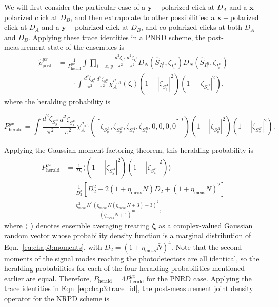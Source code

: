 \documentclass[aps,twocolumn,secnumarabic,amsmath,amssymb,pra,groupedaddress,
showpacs, showkeys]{revtex4-1}
\newcommand{\pna}[1]{\left(#1\right)}
\newcommand{\pnb}[1]{\left[#1\right]}
\newcommand{\eqn}[1]{
\begin{equation}
	#1
\end{equation}
}
\begin{document}
We will first consider the particular case of a $\mathbf{y}-$polarized click at
$D_A$ and a $\mathbf{x}-$polarized click at $D_B$, and then extrapolate to
other possibilities: a $\mathbf{x}-$polarized click at $D_A$ and a
$\mathbf{y}-$polarized click at $D_B$, and co-polarized clicks at both $D_A$
and $D_B$. Applying these trace identities in a PNRD scheme, the
post-measurement state of the ensembles is
\begin{align}
\hat{\rho}_{\textrm{post}}^{yx}& =
\frac{1}{P_{\textrm{herald}}^{yx}}\int 
\prod_{i=x,y}
\frac{d^2 \zeta_{I_i^A}}{\pi^2} 
\frac{d^2 \zeta_{I_i^B}}{\pi^2} 
D_N\pna{\hat{S}_{I_i^A},\zeta_{I_i^A}} 
D_N\pna{\hat{S}_{I_i^B},\zeta_{I_i^B}}  \nonumber \\
& \qquad \cdot \int 
\frac{d^2 \zeta_{S_y^A}}{\pi^2} 
\frac{d^2 \zeta_{S_x^B}}{\pi^2}
\chi_A^{\rho_{\textrm{out}}}\pna{\bm{\zeta}} 
\pna{1-|\zeta_{S_y^A}|^2}\pna{1-|\zeta_{S_x^B}|^2},
\end{align}
where the heralding probability is
\eqn{
P_{\textrm{herald}}^{yx} =
\int 
\frac{d^2 \zeta_{S_y^A}}{\pi^2} 
\frac{d^2 \zeta_{S_x^B}}{\pi^2}
\chi_A^{\rho_{\textrm{out}}}\pna{\pnb{\zeta_{S_y^A},\zeta_{S_y^B},\zeta_{S_x^A},\zeta_{S_x^B},0,0,0,0}^T} 
\pna{1-|\zeta_{S_y^A}|^2}\pna{1-|\zeta_{S_x^B}|^2}.
}
Applying the Gaussian moment factoring theorem, this heralding probability is
\begin{align}
P_{\textrm{herald}}^{yx}&=\frac{1}{D_2}\langle \pna{1-|\zeta_{S_y^A}|^2}\pna{1-|\zeta_{S_x^B}|^2} \rangle \nonumber \\
	&=\frac{1}{D_2^3}\pnb{D_2^2-2\pna{1+\eta_{\textrm{meas}}\bar{N}}D_2+\pna{1+\eta_{\textrm{meas}}\bar{N}}^2} \nonumber \\
	& = \frac{\eta^2_{\textrm{meas}} \bar{N}^2 (\eta_{\textrm{meas}}  \bar{N} (\eta_{\textrm{meas}}  \bar{N}+3)+3)^2}{(\eta_{\textrm{meas}}  \bar{N}+1)^{10}},
\end{align}
where $\langle~~\rangle$ denotes ensemble averaging treating $\bm{\zeta}$ as a
complex-valued Gaussian random vector whose probability density function is a
marginal distribution of Eqn.~\ref{eq:chap3:moments}, with
$D_2=\pna{1+\eta_{\textrm{meas}}\bar{N}}^4$. Note that the second-moments of
the signal modes reaching the photodetectors are all identical, so the
heralding probabilities for each of the four heralding probabilities mentioned
earlier are equal. Therefore, $P_{\textrm{herald}}=4P_{\textrm{herald}}^{yx}$
for the PNRD case. Applying the trace identities in
Eqn~\ref{eq:chap3:trace_id}, the post-measurement joint density operator for
the NRPD scheme is
\end{document}
